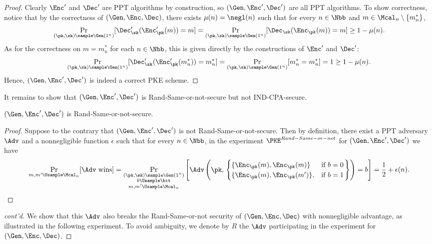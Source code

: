 \begin{answer}[iv]
    \begin{proof}
        Clearly $\Enc'$ and $\Dec'$ are PPT algorithms by construction, so $(\Gen, \Enc', \Dec')$ are all PPT algorithms.
        To show correctness, notice that by the correctness of $(\Gen, \Enc, \Dec)$, there exists $\mu(n)=\negl(n)$ such that for every $n\in\Nbb$ and $m\in\Mcal_n\setminus\{m^\ast_n\}$,
        \[
            \Pr_{(\pk, \sk)\sample \Gen(1^n)}[\Dec'_\sk(\Enc'_\pk(m))=m]
            = \Pr_{(\pk, \sk)\sample \Gen(1^n)}[\Dec_\sk(\Enc_\pk(m))=m] \ge 1-\mu(n).
        \]
        As for the correctness on $m=m^\ast_n$ for each $n\in\Nbb$, this is given directly by the constructions of $\Enc'$ and $\Dec'$:
        \[
             \Pr_{(\pk, \sk)\sample \Gen(1^n)}[\Dec'_\sk(\Enc'_\pk(m^\ast_n))=m^\ast_n]
             = \Pr_{(\pk, \sk)\sample \Gen(1^n)}[m^\ast_n=m^\ast_n]
             =1\ge 1-\mu(n).
        \]
        Hence, $(\Gen, \Enc', \Dec')$ is indeed a correct PKE scheme.
    \end{proof}
    It remains to show that $(\Gen, \Enc', \Dec')$ is Rand-Same-or-not-secure but not IND-CPA-secure.
    \begin{claim}
        $(\Gen, \Enc', \Dec')$ is Rand-Same-or-not-secure.
    \end{claim}
    \begin{proof}
        Suppose to the contrary that $(\Gen, \Enc', \Dec')$ is not Rand-Same-or-not-secure.  Then by definition, there exist a PPT adversary $\Adv$ and a nonnegligible function $\epsilon$ such that for every $n\in\Nbb$, in the experiment $\PKE^{Rand-Same-or-not}$ for $(\Gen, \Enc', \Dec')$ we have
        \begin{equation}\label{eq:p3-4-1}
            \Pr_{m,m'\Usample\Mcal_n}[\Adv \textrm{ wins}]
            =\Pr_{\substack{(\pk,\sk)\sample\Gen(1^n)\\b\Usample\bit\\m,m'\Usample\Mcal_n}}\left[\Adv\left(\pk,\left.\begin{cases}
                \{\Enc_\pk(m), \Enc_\pk(m)\} &\textrm{if } b=0\\
                \{\Enc_\pk(m), \Enc_\pk(m')\}, &\textrm{if } b=1\\
            \end{cases}\right\} \right) =b\right]
            =\frac{1}{2}+\epsilon(n).
        \end{equation}
        \end{proof}\begin{proof}[cont'd]
         We show that this $\Adv$ also breaks the Rand-Same-or-not security of $(\Gen, \Enc, \Dec)$ with nonnegligible advantage, as illustrated in the following experiment. To avoid ambiguity, we denote by $R$ the $\Adv$ participating in the experiment for $(\Gen, \Enc, \Dec)$.

\end{proof}
\end{answer}
